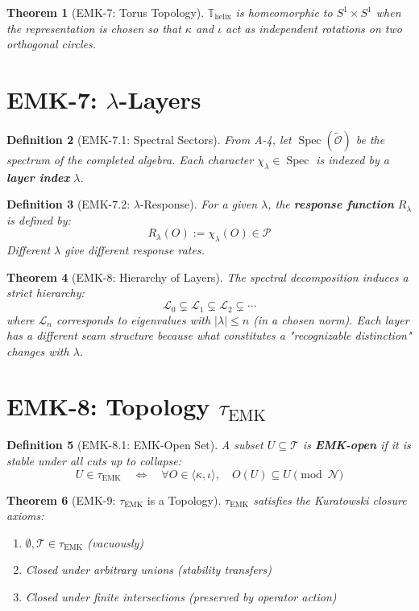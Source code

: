 \documentclass[12pt, oneside]{article}
\newtheorem{theorem}{Theorem}[section]
\newtheorem{definition}[theorem]{Definition}
\DeclareMathOperator{\Spec}{Spec}
\newcommand{\N}{\mathcal{N}}
\newcommand{\T}{\mathcal{T}}
\newcommand{\Opr}{\mathcal{O}}
\newcommand{\wtilde}{\widetilde}
\begin{document}
\begin{theorem}[EMK-7: Torus Topology]
$\mathbb{T}_{\text{helix}}$ is homeomorphic to $S^1 \times S^1$ when the representation is chosen so that $\kappa$ and $\iota$ act as independent rotations on two orthogonal circles.
\end{theorem}

\section{EMK-7: $\lambda$-Layers}

\begin{definition}[EMK-7.1: Spectral Sectors]
From A-4, let $\Spec(\wtilde{\Opr})$ be the spectrum of the completed algebra. Each character $\chi_\lambda \in \Spec$ is indexed by a \textbf{layer index} $\lambda$.
\end{definition}

\begin{definition}[EMK-7.2: $\lambda$-Response]
For a given $\lambda$, the \textbf{response function} $R_\lambda$ is defined by:
\[
R_\lambda(O) := \chi_\lambda(O) \in \mathcal{P}
\]
Different $\lambda$ give different response rates.
\end{definition}

\begin{theorem}[EMK-8: Hierarchy of Layers]
The spectral decomposition induces a strict hierarchy:
\[
\mathcal{L}_0 \subsetneq \mathcal{L}_1 \subsetneq \mathcal{L}_2 \subsetneq \cdots
\]
where $\mathcal{L}_n$ corresponds to eigenvalues with $|\lambda| \le n$ (in a chosen norm). Each layer has a different seam structure because what constitutes a "recognizable distinction" changes with $\lambda$.
\end{theorem}

\section{EMK-8: Topology $\tau_{\text{EMK}}$}

\begin{definition}[EMK-8.1: EMK-Open Set]
A subset $U \subseteq \T$ is \textbf{EMK-open} if it is stable under all cuts up to collapse:
\[
U \in \tau_{\text{EMK}} \quad\Longleftrightarrow\quad \forall O \in \langle \kappa, \iota \rangle,\quad O(U) \subseteq U \pmod{\N}
\]
\end{definition}

\begin{theorem}[EMK-9: $\tau_{\text{EMK}}$ is a Topology]
$\tau_{\text{EMK}}$ satisfies the Kuratowski closure axioms:
\begin{enumerate}
    \item $\emptyset, \T \in \tau_{\text{EMK}}$ (vacuously)
    \item Closed under arbitrary unions (stability transfers)
    \item Closed under finite intersections (preserved by operator action)
\end{enumerate}
\end{theorem}
\end{document}
